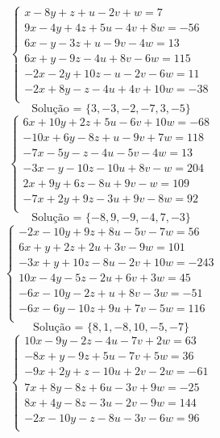 \documentclass[12pt,oneside,a4paper]{article}
\begin{document}
\vspace{\baselineskip}
\begin{equation*}
\begin{cases}
x-8y+z+u-2v+w=7 \\
9x-4y+4z+5u-4v+8w=-56 \\
6x-y-3z+u-9v-4w=13 \\
6x+y-9z-4u+8v-6w=115 \\
-2x-2y+10z-u-2v-6w=11 \\
-2x+8y-z-4u+4v+10w=-38 \\
\end{cases}
\end{equation*}
\begin{equation*}
\text{Solução = }\{3,-3,-2,-7,3,-5\}
\end{equation*}
\vspace{\baselineskip}
\begin{equation*}
\begin{cases}
6x+10y+2z+5u-6v+10w=-68 \\
-10x+6y-8z+u-9v+7w=118 \\
-7x-5y-z-4u-5v-4w=13 \\
-3x-y-10z-10u+8v-w=204 \\
2x+9y+6z-8u+9v-w=109 \\
-7x+2y+9z-3u+9v-8w=92 \\
\end{cases}
\end{equation*}
\begin{equation*}
\text{Solução = }\{-8,9,-9,-4,7,-3\}
\end{equation*}
\vspace{\baselineskip}
\begin{equation*}
\begin{cases}
-2x-10y+9z+8u-5v-7w=56 \\
6x+y+2z+2u+3v-9w=101 \\
-3x+y+10z-8u-2v+10w=-243 \\
10x-4y-5z-2u+6v+3w=45 \\
-6x-10y-2z+u+8v-3w=-51 \\
-6x-6y-10z+9u+7v-5w=116 \\
\end{cases}
\end{equation*}
\begin{equation*}
\text{Solução = }\{8,1,-8,10,-5,-7\}
\end{equation*}
\vspace{\baselineskip}
\begin{equation*}
\begin{cases}
10x-9y-2z-4u-7v+2w=63 \\
-8x+y-9z+5u-7v+5w=36 \\
-9x+2y+z-10u+2v-2w=-61 \\
7x+8y-8z+6u-3v+9w=-25 \\
8x+4y-8z-3u-2v-9w=144 \\
-2x-10y-z-8u-3v-6w=96 \\
\end{cases}
\end{equation*}
\end{document}
